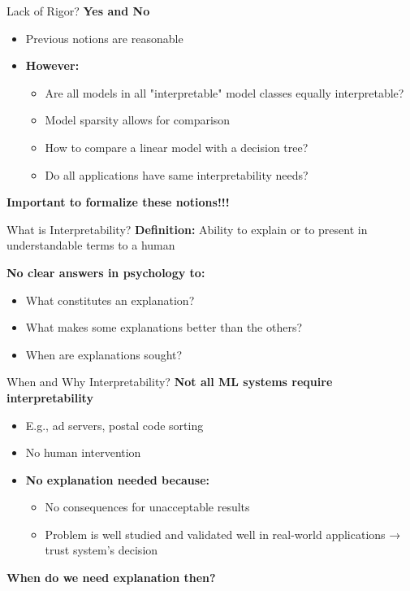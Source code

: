 \documentclass[10pt,aspectratio=169]{beamer}
\begin{document}
\begin{frame}{Lack of Rigor?}
\textbf{Yes and No}
\begin{itemize}
\item Previous notions are reasonable
\item \textbf{However:}
\begin{itemize}
\item Are all models in all "interpretable" model classes equally interpretable?
\item Model sparsity allows for comparison
\item How to compare a linear model with a decision tree?
\item Do all applications have same interpretability needs?
\end{itemize}
\end{itemize}

\vspace{0.5cm}
\textbf{Important to formalize these notions!!!}
\end{frame}

\begin{frame}{What is Interpretability?}
\textbf{Definition:} Ability to explain or to present in understandable terms to a human

\vspace{0.5cm}
\textbf{No clear answers in psychology to:}
\begin{itemize}
\item What constitutes an explanation?
\item What makes some explanations better than the others?
\item When are explanations sought?
\end{itemize}
\end{frame}

\begin{frame}{When and Why Interpretability?}
\textbf{Not all ML systems require interpretability}
\begin{itemize}
\item E.g., ad servers, postal code sorting
\item No human intervention
\item \textbf{No explanation needed because:}
\begin{itemize}
\item No consequences for unacceptable results
\item Problem is well studied and validated well in real-world applications → trust system's decision
\end{itemize}
\end{itemize}

\vspace{0.5cm}
\textbf{When do we need explanation then?}
\end{frame}
\end{document}
